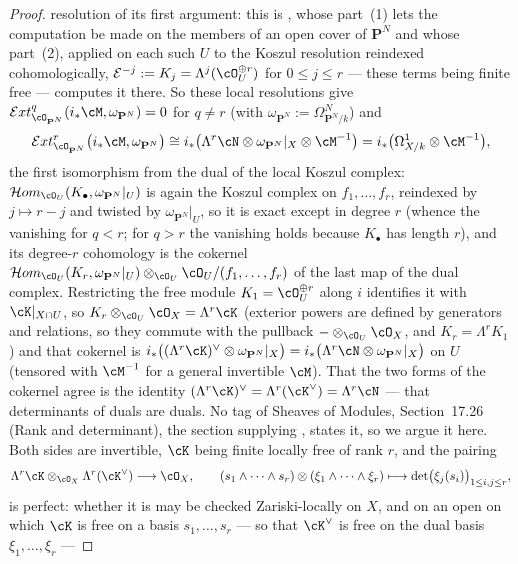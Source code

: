\begin{proof}
resolution of its first argument: this is
, whose part~(1) lets the computation
be made on the members of an open cover of $\mathbf P^N$ and whose part~(2),
applied on each such $U$ to the Koszul resolution reindexed cohomologically,
$\mathcal E^{-j}:=K_j=\Lambda^j(\cO_U^{\oplus r})$ for $0\le j\le r$ --- these
terms being finite free --- computes it there.  So these
local resolutions give
$\mathcal{E}xt^{q}_{\cO_{\mathbf P^N}}(i_*\cM,\omega_{\mathbf P^N})=0$
for $q\ne r$ (with $\omega_{\mathbf P^N}:=\Omega^N_{\mathbf P^N/k}$)
and
\[
\mathcal{E}xt^{r}_{\cO_{\mathbf P^N}}\bigl(i_*\cM,\omega_{\mathbf P^N}\bigr)
\cong i_*\bigl(\Lambda^r\cN\otimes\omega_{\mathbf P^N}|_X
\otimes\cM^{-1}\bigr)
=i_*\bigl(\Omega^1_{X/k}\otimes\cM^{-1}\bigr),
\]
the first isomorphism from the dual of the local Koszul complex:
$\mathcal{H}om_{\cO_U}(K_\bullet,\omega_{\mathbf P^N}|_U)$ is again
the Koszul complex on $f_1,\dots,f_r$, reindexed by $j\mapsto r-j$
and twisted by $\omega_{\mathbf P^N}|_U$, so it is exact except in
degree $r$ (whence the vanishing for $q<r$; for $q>r$ the vanishing
holds because $K_\bullet$ has length $r$), and its degree-$r$
cohomology is the cokernel
$\mathcal{H}om_{\cO_U}(K_r,\omega_{\mathbf P^N}|_U)
\otimes_{\cO_U}\cO_U/(f_1,\dots,f_r)$ of the last map of the dual
complex.  Restricting the free module $K_1=\cO_U^{\oplus r}$ along
$i$ identifies it with $\cK|_{X\cap U}$, so
$K_r\otimes_{\cO_U}\cO_X=\Lambda^r\cK$ (exterior powers are
defined by generators and relations, so they commute with the pullback
$-\otimes_{\cO_U}\cO_X$, and $K_r=\Lambda^r K_1$) and that cokernel is
$i_*\bigl((\Lambda^r\cK)^{\vee}\otimes\omega_{\mathbf P^N}|_X\bigr)
=i_*\bigl(\Lambda^r\cN\otimes\omega_{\mathbf P^N}|_X\bigr)$ on $U$
(tensored with $\cM^{-1}$ for a general invertible $\cM$).  That the
two forms of the cokernel agree is the identity
$(\Lambda^r\cK)^{\vee}=\Lambda^r(\cK^{\vee})=\Lambda^r\cN$ --- that
determinants of duals are duals.  No tag of Sheaves of Modules,
Section~17.26 (Rank and determinant), the section supplying
, states it, so we argue it
here.  Both sides are invertible, $\cK$ being finite locally free of
rank $r$, and the pairing
\[
\Lambda^r\cK\otimes_{\cO_X}\Lambda^r(\cK^{\vee})\longrightarrow\cO_X,
\qquad
(s_1\wedge\cdots\wedge s_r)\otimes(\xi_1\wedge\cdots\wedge\xi_r)
\longmapsto\det\bigl(\xi_j(s_i)\bigr)_{1\le i,j\le r},
\]
is perfect: whether it is may be checked Zariski-locally on $X$, and
on an open on which $\cK$ is free on a basis $s_1,\dots,s_r$ --- so
that $\cK^{\vee}$ is free on the dual basis $\xi_1,\dots,\xi_r$ ---

\end{proof}
